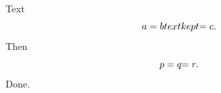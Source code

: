 \documentclass{article}
\begin{document}
Text \begin{equation} a=b $$ text kept $$ =c. \end{equation} Then
\begin{equation} p=q $$ $$ =r. \end{equation} Done.
\end{document}
